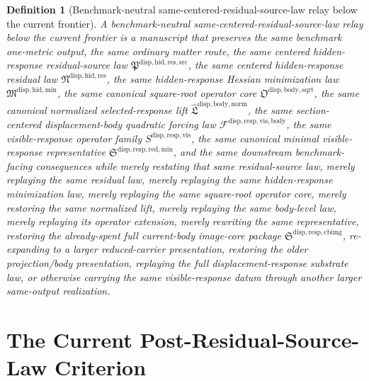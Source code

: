 \documentclass[11pt]{article}
\newcommand{\ResidualSourceLawPackage}{\mathfrak P^{\mathrm{disp,hid,res,src}}}
\newcommand{\ResidualLawPackage}{\mathfrak N^{\mathrm{disp,hid,res}}}
\newcommand{\HiddenMinimizationPackage}{\mathfrak M^{\mathrm{disp,hid,min}}}
\newcommand{\SquareRootOperatorCore}{\mathfrak O^{\mathrm{disp,body,sqrt}}}
\newcommand{\NormalizedLiftPackage}{\widehat{\mathfrak L}^{\mathrm{disp,body,norm}}}
\newcommand{\VisibleBodyForcingLaw}{\mathscr F^{\mathrm{disp,resp,vis,body}}}
\newcommand{\VisibleResponseOperator}{S^{\mathrm{disp,resp,vis}}}
\newcommand{\MinimalReducedStructure}{\mathfrak S^{\mathrm{disp,resp,red,min}}}
\newcommand{\CurrentBodyImageCore}{\mathfrak S^{\mathrm{disp,resp,cbimg}}}
\newtheorem{definition}{Definition}
\begin{document}
\begin{definition}[Benchmark-neutral same-centered-residual-source-law relay below the current frontier]
A \emph{benchmark-neutral same-centered-residual-source-law relay below the current frontier} is a manuscript that preserves the same benchmark one-metric output, the same ordinary matter route, the same centered hidden-response residual-source law \(\ResidualSourceLawPackage\), the same centered hidden-response residual law \(\ResidualLawPackage\), the same hidden-response Hessian minimization law \(\HiddenMinimizationPackage\), the same canonical square-root operator core \(\SquareRootOperatorCore\), the same canonical normalized selected-response lift \(\NormalizedLiftPackage\), the same section-centered displacement-body quadratic forcing law \(\VisibleBodyForcingLaw\), the same visible-response operator family \(\VisibleResponseOperator\), the same canonical minimal visible-response representative \(\MinimalReducedStructure\), and the same downstream benchmark-facing consequences while merely restating that same residual-source law, merely replaying the same residual law, merely replaying the same hidden-response minimization law, merely replaying the same square-root operator core, merely restoring the same normalized lift, merely replaying the same body-level law, merely replaying its operator extension, merely rewriting the same representative, restoring the already-spent full current-body image-core package \(\CurrentBodyImageCore\), re-expanding to a larger reduced-carrier presentation, restoring the older projection/body presentation, replaying the full displacement-response substrate law, or otherwise carrying the same visible-response datum through another larger same-output realization.
\end{definition}

\section{The Current Post-Residual-Source-Law Criterion}
\end{document}
